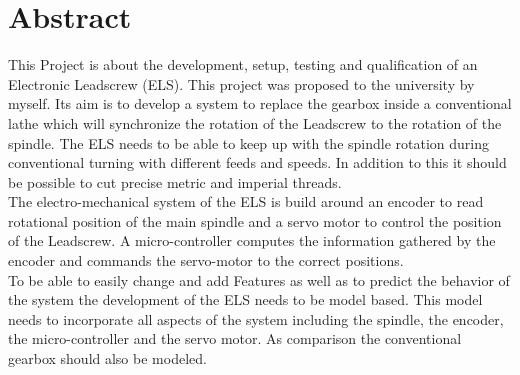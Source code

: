 \chapter*{Abstract}
\label{abstract}

This Project is about the development, setup, testing and qualification of an Electronic Leadscrew (ELS). This project was proposed to the university by myself. 
Its aim is to develop a system to replace the gearbox inside a conventional lathe which will synchronize the rotation of the Leadscrew to the rotation of the spindle.
The ELS needs to be able to keep up with the spindle rotation during conventional turning with different feeds and speeds. In addition to this it should be possible to cut 
precise metric and imperial threads.\\

The electro-mechanical system of the ELS is build around an encoder to read rotational position of the main spindle and a servo motor to control the position of the Leadscrew.
A micro-controller computes the information gathered by the encoder and commands the servo-motor to the correct positions.\\

To be able to easily change and add Features as well as to predict the behavior of the system the development of the ELS needs to be model based. This model needs to incorporate all aspects
of the system including the spindle, the encoder, the micro-controller and the servo motor. As comparison the conventional gearbox should also be modeled.\\

